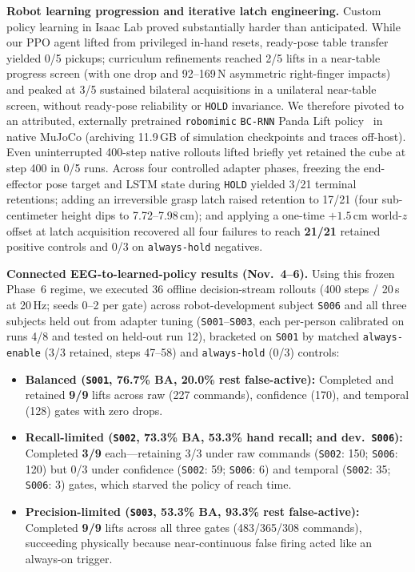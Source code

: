 \documentclass{article}
\begin{document}
\textbf{Robot learning progression and iterative latch engineering.} Custom policy learning in Isaac Lab proved substantially harder than anticipated. While our PPO agent lifted from privileged in-hand resets, ready-pose table transfer yielded 0/5 pickups; curriculum refinements reached 2/5 lifts in a near-table progress screen (with one drop and 92--169\,N asymmetric right-finger impacts) and peaked at 3/5 sustained bilateral acquisitions in a unilateral near-table screen, without ready-pose reliability or \texttt{HOLD} invariance. We therefore pivoted to an attributed, externally pretrained \texttt{robomimic} \texttt{BC-RNN} Panda Lift policy~\citep{mandlekar2021} in native MuJoCo (archiving 11.9\,GB of simulation checkpoints and traces off-host). Even uninterrupted 400-step native rollouts lifted briefly yet retained the cube at step 400 in 0/5 runs. Across four controlled adapter phases, freezing the end-effector pose target and LSTM state during \texttt{HOLD} yielded 3/21 terminal retentions; adding an irreversible grasp latch raised retention to 17/21 (four sub-centimeter height dips to 7.72--7.98\,cm); and applying a one-time $+1.5$\,cm world-$z$ offset at latch acquisition recovered all four failures to reach \textbf{21/21} retained positive controls and 0/3 on \texttt{always-hold} negatives.

\textbf{Connected EEG-to-learned-policy results (Nov.\ 4--6).} Using this frozen Phase~6 regime, we executed 36 offline decision-stream rollouts (400 steps / 20\,s at 20\,Hz; seeds 0--2 per gate) across robot-development subject \texttt{S006} and all three subjects held out from adapter tuning (\texttt{S001}--\texttt{S003}, each per-person calibrated on runs 4/8 and tested on held-out run 12), bracketed on \texttt{S001} by matched \texttt{always-enable} (3/3 retained, steps 47--58) and \texttt{always-hold} (0/3) controls:
\begin{itemize}
  \item \textbf{Balanced (\texttt{S001}, 76.7\% BA, 20.0\% rest false-active):} Completed and retained \textbf{9/9} lifts across raw (227 commands), confidence (170), and temporal (128) gates with zero drops.
  \item \textbf{Recall-limited (\texttt{S002}, 73.3\% BA, 53.3\% hand recall; and dev.\ \texttt{S006}):} Completed \textbf{3/9} each---retaining 3/3 under raw commands (\texttt{S002}: 150; \texttt{S006}: 120) but 0/3 under confidence (\texttt{S002}: 59; \texttt{S006}: 6) and temporal (\texttt{S002}: 35; \texttt{S006}: 3) gates, which starved the policy of reach time.
  \item \textbf{Precision-limited (\texttt{S003}, 53.3\% BA, 93.3\% rest false-active):} Completed \textbf{9/9} lifts across all three gates (483/365/308 commands), succeeding physically because near-continuous false firing acted like an always-on trigger.
\end{itemize}
\end{document}
